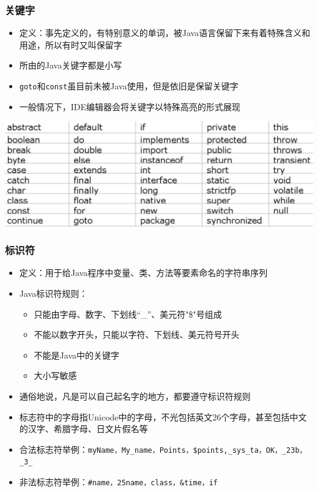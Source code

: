 \begin{frame}
  \frametitle{关键字}
  \begin{itemize}
    \item 定义：事先定义的，有特别意义的单词，被Java语言保留下来有着特殊含义和用途，所以有时又叫保留字
    \item 所由的Java关键字都是小写
    \item \texttt{goto}和\texttt{const}虽目前未被Java使用，但是依旧是保留关键字
    \item 一般情况下，IDE编辑器会将关键字以特殊高亮的形式展现
  \end{itemize}
  \includegraphics[width=\textwidth]{figures/keywords}
\end{frame}

\begin{frame}
  \frametitle{标识符}
  \begin{itemize}
    \item 定义：用于给Java程序中变量、类、方法等要素命名的字符串序列
    \item Java标识符规则：
      \begin{itemize}
        \item 只能由字母、数字、下划线“\_”、美元符"\$"号组成
        \item 不能以数字开头，只能以字符、下划线、美元符号开头
        \item 不能是Java中的关键字
        \item 大小写敏感
      \end{itemize}
    \item 通俗地说，凡是可以自己起名字的地方，都要遵守标识符规则
    \item 标志符中的字母指Unicode中的字母，不光包括英文26个字母，甚至包括中文的汉字、希腊字母、日文片假名等
    \item 合法标志符举例：\texttt{myName，My\_name，Points，\$points,\_sys\_ta，OK，\_23b，\_3\_}
    \item 非法标志符举例：\texttt{\#name，25name，class，\&time，if}
  \end{itemize}
\end{frame}


